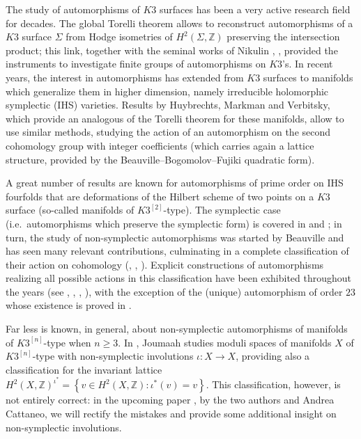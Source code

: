 \documentclass{amsart}
\theoremstyle{definition}
\newcommand{\ra}{\rightarrow}
\newcommand{\IZ}{\mathbb{Z}}
\newcommand{\hsk}{K3^{\left[2\right]}}
\newcommand{\hskn}{K3^{\left[n\right]}}
\begin{document}
The study of automorphisms of $K3$ surfaces has been a very active research field for decades. The global Torelli theorem  allows to reconstruct automorphisms of a $K3$ surface $\Sigma$ from Hodge isometries of $H^2(\Sigma, \IZ)$ preserving the intersection product; this link, together with the seminal works of Nikulin \cite{nikulin}, \cite{nikulin2}, provided the instruments to investigate finite groups of automorphisms on $K3$'s. In recent years, the interest in automorphisms has extended from $K3$ surfaces to manifolds which generalize them in higher dimension, namely irreducible holomorphic symplectic (IHS) varieties. Results by Huybrechts, Markman and Verbitsky, which provide an analogous of the Torelli theorem for these manifolds, allow to use similar methods, studying the action of an automorphism on the second cohomology group with integer coefficients (which carries again a lattice structure, provided by the Beauville--Bogomolov--Fujiki quadratic form).

A great number of results are known for automorphisms of prime order on IHS fourfolds that are deformations of the Hilbert scheme of two points on a $K3$ surface (so-called manifolds of $\hsk$-type). The symplectic case (i.e.\ automorphisms which preserve the symplectic form) is covered in \cite{camere_sympl_inv} and \cite{mongardi_thesis}; in turn, the study of non-symplectic automorphisms was started by Beauville \cite{beauville_inv} and has seen many relevant contributions, culminating in a complete classification of their action on cohomology (\cite{bcs}, \cite{bcms_p=23}, \cite{tari}). Explicit constructions of automorphisms realizing all possible actions in this classification have been exhibited throughout the years (see \cite{o'grady_epw}, \cite{bcs}, \cite{mw}, \cite{ckkm}), with the exception of the (unique) automorphism of order $23$ whose existence is proved in \cite{bcms_p=23}.

Far less is known, in general, about non-symplectic automorphisms of manifolds of $\hskn$-type when $n \geq 3$. In \cite{joumaah}, Joumaah studies moduli spaces of manifolds $X$ of $\hskn$-type with non-symplectic involutions $\iota: X \ra X$, providing also a classification for the invariant lattice $H^2(X, \IZ)^{\iota^*} = \left\{ v \in H^2(X, \IZ): \iota^*(v)=v \right\}$. This classification, however, is not entirely correct: in the upcoming paper \cite{CCC}, by the two authors and Andrea Cattaneo, we will rectify the mistakes and provide some additional insight on non-symplectic involutions.
\end{document}

